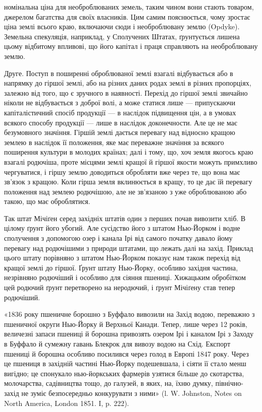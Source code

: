 номінальна ціна для необроблюваних земель, таким чином вони стають товаром,
джерелом багатства для своїх власників. Цим самим пояснюється, чому зростає ціна
землі всього краю, включаючи сюди і необроблювану землю (Opdyke).
Земельна спекуляція, наприклад, у Сполучених Штатах, ґрунтується лишена цьому
відбитому впливові, що його капітал і праця справляють на необроблювану землю.

Друге. Поступ в поширенні оброблюваної землі взагалі відбувається або в
напрямку до гіршої землі, або на різних даних родах землі в різних пропорціях,
залежно від того, що є зручного в наявності. Перехід до гіршої землі звичайно
ніколи не відбувається з доброї волі, а може статися лише — припускаючи капіталістичний спосіб
продукції — в наслідок підвищення цін, а в умовах всякого
способу продукції — лише в наслідок доконечности. Але це не має безумовного значіння. Гіршій землі
дається перевагу над відносно кращою землею в наслідок
її положення, яке має переважне значіння за всякого поширення культури
в молодих країнах; далі і тому, що, хоч земля якогось краю взагалі родючіша,
проте місцями землі кращої й гіршої якости можуть примхливо чергуватися, і
гіршу землю доводиться обробляти вже через те, що вона має зв’язок з кращою.
Коли гірша земля вклинюється в кращу, то це дає їй перевагу положення
над землею родючішою, але не зв’язаною з уже оброблюваною або такою, що має
оброблятися.

Так штат Мічіґен серед західніх штатів один з перших почав вивозити
хліб. В цілому ґрунт його убогий. Але сусідство його з штатом Нью-Йорком і
водне сполучення з допомогою озер і канала Ірі від самого початку давало йому
перевагу над родючішими з природи штатами, що лежать далі на захід.
Приклад цього штату порівняно з штатом Нью-Йорком показує нам також
перехід від кращої землі до гіршої. Ґрунт штату Нью-Йорку, особливо західня
частина, незрівняно родючіший і особливо для сіяння пшениці. Хижацьким обробітком
цей родючий ґрунт перетворено на неродючий, і ґрунт Мічіґену став тепер
родючіший.

«1836 року пшеничне борошно з Буффало вивозили на Захід водою, переважно
з пшеничної округи Нью-Йорку й Верхньої Канади. Тепер, лише через
12 років, величезні запаси пшениці й борошна привозять озером Ірі і каналом
Ірі з Заходу в Буффало й сумежну гавань Блекрок для вивозу водою на
Схід. Експорт пшениці й борошна особливо посилився через голод в Европі
1847 року. Через це пшениця в західній частині Нью-Йорку подешевшала, і
сіяти її стало менш вигідно; це спонукало нью-йоркських фармерів узятися
більше до скотарства, молочарства, садівництва тощо, до галузей, в яких, на,
їхню думку, північно-захід не зуміє безпосередньо конкурувати з ними» (l. W.
Johnston, Notes on North America, London 1851. I, p. 222).

